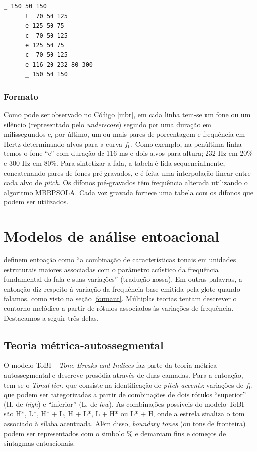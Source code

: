 \begin{lstlisting}[caption=Exemplo de arquivo de entrada para MBROLA, label=mbr]
      _ 150 50 150
      t  70 50 125
      e 125 50 75
      c  70 50 125
      e 125 50 75
      c  70 50 125
      e 116 20 232 80 300
      _ 150 50 150
\end{lstlisting}

\subsubsection{Formato}
Como pode ser observado no Código \ref{mbr}, em cada linha tem-se um fone ou um
silêncio (representado pelo \emph{underscore}) seguido por uma duração em
milissegundos e, por último, um ou mais pares de porcentagem e frequência em
Hertz determinando alvos para a curva $ f_0 $. Como exemplo, na penúltima linha temos
o fone ``e'' com duração de 116 ms e dois alvos para altura; 232 Hz em 20\% e
300 Hz em 80\%. Para sintetizar a fala, a tabela é lida sequencialmente,
concatenando pares de fones pré-gravados, e é feita uma interpolação linear
entre cada alvo de \emph{pitch}. Os dífonos pré-gravados têm frequência alterada
utilizando o algoritmo MBRPSOLA. Cada voz gravada fornece uma tabela com os dífonos que podem ser utilizados. 

\section{Modelos de análise entoacional}
\label{entoa}

 definem entoação como ``a combinação de características
tonais em unidades estruturais maiores associadas com o parâmetro acústico da
frequência fundamental da fala e suas variações'' (tradução nossa). Em outras
palavras, a entoação diz respeito à variação da frequência base emitida pela
glote quando falamos, como visto na seção \ref{formant}. Múltiplas teorias
tentam descrever o contorno melódico a partir de rótulos associados às variações
de frequência. Destacamos a seguir três delas.

\subsection{Teoria métrica-autossegmental}
O modelo ToBI -- \emph{Tone Breaks and Indices} \cite{tobi} faz parte da teoria
métrica-autossegmental e descreve prosódia através de duas camadas. Para a
entoação, tem-se o \emph{Tonal tier}, que consiste na identificação de
\emph{pitch accents}: variações de $ f_0 $ que podem ser categorizadas a partir de
combinações de dois rótulos ``superior'' (H, de \emph{high}) e ``inferior'' (L,
de \emph{low}). As combinações possíveis do modelo ToBI são H*, L*, H* + L, H +
L*, L + H* ou L* + H, onde a estrela sinaliza o tom associado à sílaba
acentuada. Além disso, \emph{boundary tones} (ou tons de fronteira) podem ser
representados com o simbolo \% e demarcam fins e começos de sintagmas
entoacionais.

